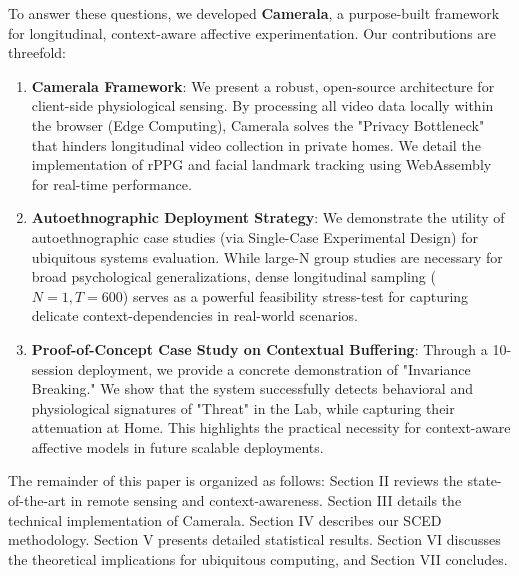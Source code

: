 \documentclass[journal]{IEEEtran}
\begin{document}
To answer these questions, we developed \textbf{Camerala}, a purpose-built framework for longitudinal, context-aware affective experimentation. 
Our contributions are threefold:

\begin{enumerate}
    \item \textbf{Camerala Framework}: We present a robust, open-source architecture for client-side physiological sensing. 
    By processing all video data locally within the browser (Edge Computing), Camerala solves the "Privacy Bottleneck" 
    that hinders longitudinal video collection in private homes. We detail the implementation of rPPG and facial landmark tracking 
    using WebAssembly for real-time performance.
    
    \item \textbf{Autoethnographic Deployment Strategy}: We demonstrate the utility of autoethnographic case studies (via Single-Case Experimental Design) for ubiquitous systems evaluation. While large-N group studies are necessary for broad psychological generalizations, dense longitudinal sampling ($N=1, T=600$) serves as a powerful feasibility stress-test for capturing delicate context-dependencies in real-world scenarios.
    
    \item \textbf{Proof-of-Concept Case Study on Contextual Buffering}: Through a 10-session deployment, we provide a concrete demonstration of "Invariance Breaking." We show that the system successfully detects behavioral and physiological signatures of "Threat" in the Lab, while capturing their attenuation at Home. This highlights the practical necessity for context-aware affective models in future scalable deployments.
\end{enumerate}

The remainder of this paper is organized as follows: Section II reviews the state-of-the-art in remote sensing and context-awareness. 
Section III details the technical implementation of Camerala. Section IV describes our SCED methodology. 
Section V presents detailed statistical results. Section VI discusses the theoretical implications for ubiquitous computing, and Section VII concludes.

\end{document}
